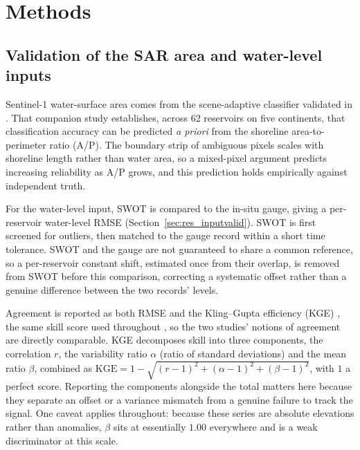 \section{Methods}
\label{sec:methods}

\subsection{Validation of the SAR area and water-level inputs}
\label{sec:inputvalid}
Sentinel-1 water-surface area comes from the scene-adaptive classifier validated in
\citet{PaperOne}. That companion study establishes, across 62 reservoirs on five
continents, that classification accuracy can be predicted \emph{a priori} from the
shoreline area-to-perimeter ratio (A/P). The boundary strip of ambiguous pixels scales
with shoreline length rather than water area, so a mixed-pixel argument predicts
increasing reliability as A/P grows, and this prediction holds empirically against
independent truth.

For the water-level input, SWOT is compared to the in-situ gauge, giving a per-reservoir
water-level RMSE (Section~\ref{sec:res_inputvalid}). SWOT is first screened for outliers,
then matched to the gauge record within a short time tolerance. SWOT and the gauge are
not guaranteed to share a common reference, so a per-reservoir constant shift, estimated
once from their overlap, is removed from SWOT before this comparison, correcting a
systematic offset rather than a genuine difference between the two records' levels.

Agreement is reported as both RMSE and the Kling--Gupta efficiency (KGE)
\citep{Gupta2009}, the same skill score used throughout \citet{PaperOne}, so the two
studies' notions of agreement are directly comparable. KGE decomposes skill into three
components, the correlation $r$, the variability ratio $\alpha$ (ratio of standard
deviations) and the mean ratio $\beta$, combined as
$\mathrm{KGE}=1-\sqrt{(r-1)^2+(\alpha-1)^2+(\beta-1)^2}$, with $1$ a perfect score.
Reporting the components alongside the total matters here because they separate an
offset or a variance mismatch from a genuine failure to track the signal. One caveat
applies throughout: because these series are absolute elevations rather than anomalies,
$\beta$ sits at essentially $1.00$ everywhere and is a weak discriminator at this scale.

